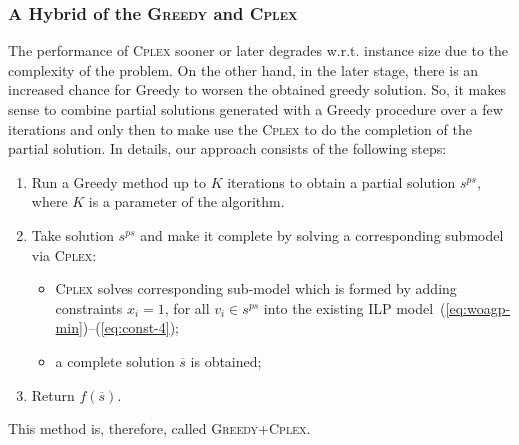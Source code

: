 \documentclass[runningheads,a4paper]{elsarticle}
\begin{document}
\subsubsection{A Hybrid of the \textsc{Greedy} and \textsc{Cplex}}
	The performance of \textsc{Cplex}  sooner or later degrades w.r.t. instance size due to the complexity of the problem. On the other hand, in the later stage, there is an increased chance for Greedy to worsen the obtained greedy solution. So, it makes sense to combine  partial solutions generated with a Greedy procedure over a few iterations  and only then to make use the \textsc{Cplex} to do the completion of the partial solution. In details, our approach consists of the following steps:
	\begin{enumerate}
		\item Run a Greedy method up to $K$ iterations  to obtain a partial solution $s^{ps}$, where $K$ is a parameter of the algorithm.
		\item Take solution $s^{ps}$ and make it complete by solving a corresponding submodel via \textsc{Cplex}:
		\begin{itemize}
			\item \textsc{Cplex} solves corresponding sub-model which is formed by adding constraints $x_{i} = 1$, for all $v_i \in s^{ps}$ into the existing ILP  model~(\ref{eq:woagp-min})--(\ref{eq:const-4});
			\item a complete solution $\overline s$ is obtained;
		\end{itemize}
		\item Return $f(\overline s)$.
	\end{enumerate}
    This method is, therefore, called \textsc{Greedy}+\textsc{Cplex}.

	
\end{document}
